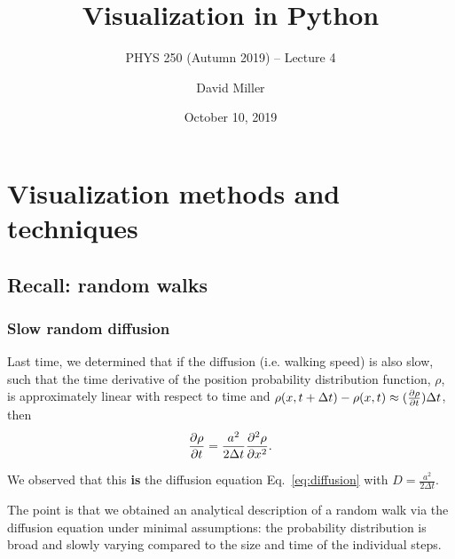 \documentclass[hyperref={colorlinks=true}]{beamer}
\title[PHYS 250 (Autumn 2019) -- Lecture 4]{Visualization in Python}
\subtitle{PHYS 250 (Autumn 2019) -- Lecture 4}
\author[D.W.~Miller]{David Miller}
\institute[EFI, Chicago] 
{
  Department of Physics and the Enrico Fermi Institute\\
  University of Chicago
}
\date[October 10, 2019]{October 10, 2019}
\begin{document}

{
\begin{frame}
  \titlepage
\end{frame}
}

\section[Visualization methods and techniques]{Visualization methods and techniques}

\subsection[Recall: random walks]{Recall: random walks}

\begin{frame}%
  \frametitle{Slow random diffusion}
  
  Last time, we determined that if the diffusion (i.e. walking speed) is also slow, such that the time derivative of the position probability distribution function, $\rho$, is approximately linear with respect to time and $\rho(x, t + \Delta t) - \rho(x, t) \approx (\frac{\partial \rho}{\partial t}) \Delta t$, then
  \begin{eqnarray}
    \frac{\partial \rho}{\partial t} = \frac{a^2}{2 \Delta t} \frac{\partial^2 \rho}{\partial x^2}.
  \end{eqnarray}

  We observed that this \textbf{is} the diffusion equation Eq.~\ref{eq:diffusion} with $D=\frac{a^2}{2 \Delta t}$.
  
  \vspace{0.3cm}
  
  The point is that we obtained an analytical description of a random walk via the diffusion equation under minimal assumptions: the probability distribution is broad and slowly varying compared to the size and time of the individual steps.

\end{frame}
\end{document}
